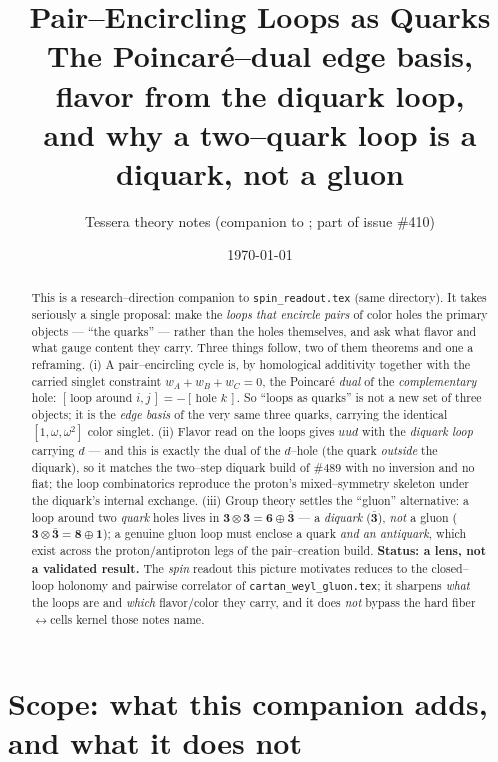 \documentclass[11pt,oneside]{article}
\title{\bfseries Pair--Encircling Loops as Quarks\\[4pt]
\large The Poincar\'e--dual edge basis, flavor from the diquark loop,\\
and why a two--quark loop is a diquark, not a gluon}
\author{Tessera theory notes \quad(companion to \code{spin\_readout.tex}; part of issue \#410)}
\date{\today}
\newcommand{\code}[1]{\texttt{#1}}
\newcommand{\bn}{\bar{\mathbf{3}}}
\newcommand{\thr}{\mathbf{3}}
\newcommand{\eg}{\mathbf{8}}
\newcommand{\six}{\mathbf{6}}
\theoremstyle{plain}
\begin{document}
\maketitle

\begin{abstract}
\noindent
This is a research--direction companion to \code{spin\_readout.tex} (same
directory). It takes seriously a single proposal: make the \emph{loops that
encircle pairs} of color holes the primary objects --- ``the quarks'' --- rather
than the holes themselves, and ask what flavor and what gauge content they carry.
Three things follow, two of them theorems and one a reframing. (i) A
pair--encircling cycle is, by homological additivity together with the carried
singlet constraint $w_A+w_B+w_C=0$, the Poincar\'e \emph{dual} of the
\emph{complementary} hole: $[\,\text{loop around }i,j\,]=-[\,\text{hole }k\,]$. So
``loops as quarks'' is not a new set of three objects; it is the \emph{edge
basis} of the very same three quarks, carrying the identical $[1,\omega,\omega^2]$
color singlet. (ii) Flavor read on the loops gives $uud$ with the
\emph{diquark loop} carrying $d$ --- and this is exactly the dual of the
$d$--hole (the quark \emph{outside} the diquark), so it matches the two--step
diquark build of \#489 with no inversion and no fiat; the loop combinatorics
reproduce the proton's mixed--symmetry skeleton under the diquark's internal
exchange. (iii) Group theory settles the ``gluon'' alternative: a loop around two
\emph{quark} holes lives in $\thr\otimes\thr=\six\oplus\bn$ --- a \emph{diquark}
($\bn$), \emph{not} a gluon ($\thr\otimes\bn=\eg\oplus\mathbf 1$); a genuine
gluon loop must enclose a quark \emph{and an antiquark}, which exist across the
proton/antiproton legs of the pair--creation build. \textbf{Status: a lens, not a
validated result.} The \emph{spin} readout this picture motivates reduces to the
closed--loop holonomy and pairwise correlator of \code{cartan\_weyl\_gluon.tex};
it sharpens \emph{what} the loops
are and \emph{which} flavor/color they carry, and it does \emph{not} bypass the
hard fiber$\leftrightarrow$cells kernel those notes name.
\end{abstract}

\tableofcontents
\bigskip

\section{Scope: what this companion adds, and what it does not}
\label{sec:scope}
\end{document}
